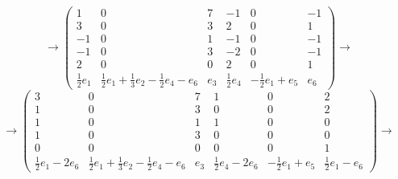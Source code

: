 \documentclass[12pt]{article}
\begin{document}
    \[
        \rightarrow
        \begin{pmatrix}
            1               & 0                                                        & 7   & -1              & 0                      & -1  \\
            3               & 0                                                        & 3   & 2               & 0                      & 1   \\
            -1              & 0                                                        & 1   & -1              & 0                      & -1  \\
            -1              & 0                                                        & 3   & -2              & 0                      & -1  \\
            2               & 0                                                        & 0   & 2               & 0                      & 1   \\
            \frac{1}{2} e_1 & \frac{1}{2}e_1 + \frac{1}{3} e_2 - \frac{1}{2} e_4 - e_6 & e_3 & \frac{1}{2} e_4 & -\frac{1}{2} e_1 + e_5 & e_6
        \end{pmatrix}
        \rightarrow
    \]
    \[
        \rightarrow
        \begin{pmatrix}
            3                       & 0                                                        & 7   & 1                       & 0                      & 2                     \\
            1                       & 0                                                        & 3   & 0                       & 0                      & 2                     \\
            1                       & 0                                                        & 1   & 1                       & 0                      & 0                     \\
            1                       & 0                                                        & 3   & 0                       & 0                      & 0                     \\
            0                       & 0                                                        & 0   & 0                       & 0                      & 1                     \\
            \frac{1}{2} e_1 - 2 e_6 & \frac{1}{2}e_1 + \frac{1}{3} e_2 - \frac{1}{2} e_4 - e_6 & e_3 & \frac{1}{2} e_4 - 2 e_6 & -\frac{1}{2} e_1 + e_5 & \frac{1}{2} e_1 - e_6
        \end{pmatrix}
        \rightarrow
    \]
\end{document}
